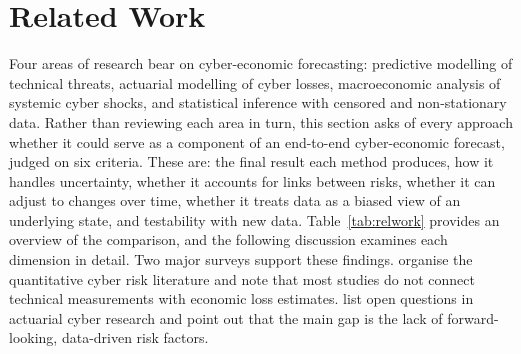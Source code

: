 \documentclass[review]{elsarticle}
\begin{document}
\section{Related Work}
\label{related_work}
Four areas of research bear on cyber-economic forecasting: predictive modelling of technical threats, actuarial modelling of cyber losses, macroeconomic analysis of systemic cyber shocks, and statistical inference with censored and non-stationary data. Rather than reviewing each area in turn, this section asks of every approach whether it could serve as a component of an end-to-end cyber-economic forecast, judged on six criteria. These are: the final result each method produces, how it handles uncertainty, whether it accounts for links between risks, whether it can adjust to changes over time, whether it treats data as a biased view of an underlying state, and testability with new data. Table~\ref{tab:relwork} provides an overview of the comparison, and the following discussion examines each dimension in detail. Two major surveys support these findings. \citet{woods2021} organise the quantitative cyber risk literature and note that most studies do not connect technical measurements with economic loss estimates. \citet{eling2020} list open questions in actuarial cyber research and point out that the main gap is the lack of forward-looking, data-driven risk factors.

\begin{table}[H]
\centering
\caption{Existing approaches compared on the six dimensions required for a component in an end-to-end cyber-economic pipeline.}
\label{tab:relwork}
\small
{}
\end{table}
\end{document}
